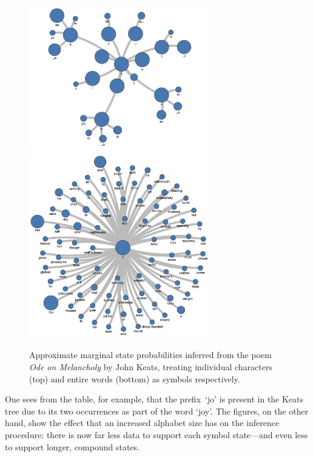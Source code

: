 \documentclass[11pt,a4paper]{article}
\begin{document}
\begin{figure}[htbp]
\centering
  \includegraphics[width=0.7\textwidth]{figures/text 1c} \\
  \vspace{1em}
  \includegraphics[width=0.7\textwidth]{figures/text 1w}
\caption{Approximate marginal state probabilities inferred from the poem
  \textit{Ode on Melancholy} by John Keats, treating individual characters (top)
  and entire words (bottom) as symbols respectively.}
\label{fig:text 1}
\end{figure}

One sees from the table, for example, that the prefix~`jo' is present in the
Keats tree due to its two occurrences as part of the word `joy'. The figures, on
the other hand, show the effect that an increased alphabet size has on the
inference procedure: there is now far less data to support each symbol
state---and even less to support longer, compound states.
\end{document}
